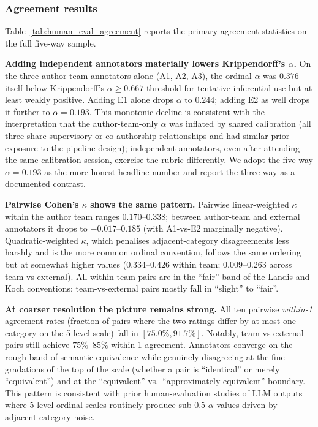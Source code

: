 \subsubsection{Agreement results}
\label{sec:human_eval_agreement_results}



Table~\ref{tab:human_eval_agreement} reports the primary agreement
statistics on the full five-way sample.

\textbf{Adding independent annotators materially lowers Krippendorff's
$\alpha$.} On the three author-team annotators alone (A1, A2, A3), the
ordinal $\alpha$ was $0.376$ --- itself below Krippendorff's
$\alpha \geq 0.667$ threshold for tentative inferential use but at least
weakly positive. Adding E1 alone drops $\alpha$ to $0.244$; adding E2 as
well drops it further to $\alpha = 0.193$. This monotonic decline is
consistent with the interpretation that the author-team-only $\alpha$
was inflated by shared calibration (all three share supervisory or
co-authorship relationships and had similar prior exposure to the
pipeline design); independent annotators, even after attending the same
calibration session, exercise the rubric differently. We adopt the
five-way $\alpha = 0.193$ as the more honest headline number and report
the three-way as a documented contrast.

\textbf{Pairwise Cohen's $\kappa$ shows the same pattern.} Pairwise
linear-weighted $\kappa$ within the author team ranges $0.170$--$0.338$;
between author-team and external annotators it drops to $-0.017$--$0.185$
(with A1-vs-E2 marginally negative). Quadratic-weighted $\kappa$, which
penalises adjacent-category disagreements less harshly and is the more
common ordinal convention, follows the same ordering but at somewhat
higher values ($0.334$--$0.426$ within team; $0.009$--$0.263$
across team-vs-external). All within-team pairs are in the ``fair'' band
of the Landis and Koch conventions; team-vs-external pairs mostly fall
in ``slight'' to ``fair''.

\textbf{At coarser resolution the picture remains strong.} All ten
pairwise \emph{within-1} agreement rates (fraction of pairs where the
two ratings differ by at most one category on the 5-level scale) fall
in $[75.0\%, 91.7\%]$. Notably, team-vs-external pairs still achieve
$75\%$--$85\%$ within-1 agreement. Annotators converge on the rough
band of semantic equivalence while genuinely disagreeing at the fine
gradations of the top of the scale (whether a pair is ``identical'' or
merely ``equivalent'') and at the ``equivalent'' vs.\ ``approximately
equivalent'' boundary. This pattern is consistent with prior
human-evaluation studies of LLM outputs where 5-level ordinal scales
routinely produce sub-$0.5$ $\alpha$ values driven by
adjacent-category noise.

